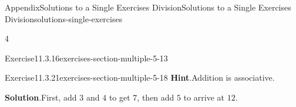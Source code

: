 \documentclass[twoside,10pt,]{article}
\newcommand{\blocktitlefont}{\relax}
\numberwithin{equation}{section}
\begin{document}
\begin{solutions-section}{Appendix}{Solutions to a Single Exercises Division}{}{Solutions to a Single Exercises Division}{}{}{solutions-single-exercises}
\begin{exercisegroupcol}{4}
\begin{divisionsolutionegcol}{Exercise}{11.3.16}{}{exercises-section-multiple-5-13}
\end{divisionsolutionegcol}%
\begin{divisionsolutionegcol}{Exercise}{11.3.21}{}{exercises-section-multiple-5-18}%
\noindent\textbf{\blocktitlefont Hint}.\hypertarget{exercises-section-multiple-5-18-2-back}{}\quad{}Addition is associative.%
\par\smallskip%
\noindent\textbf{\blocktitlefont Solution}.\hypertarget{exercises-section-multiple-5-18-4-back}{}\quad{}First, add \(3\) and \(4\) to get \(7\), then add \(5\) to arrive at \(12\).%
\end{divisionsolutionegcol}%
\end{exercisegroupcol}
\par\medskip\noindent
\end{solutions-section}
%
%
\typeout{************************************************}
\typeout{************************************************}
%
\end{document}
